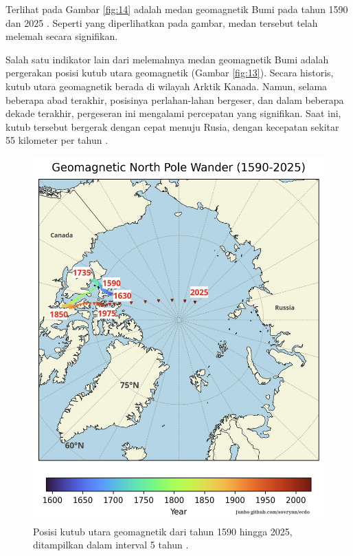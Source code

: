 \documentclass[10pt,twocolumn,letterpaper]{article}
\begin{document}
Terlihat pada Gambar \ref{fig:14} adalah medan geomagnetik Bumi pada tahun 1590 dan 2025 \cite{125,126}. Seperti yang diperlihatkan pada gambar, medan tersebut telah melemah secara signifikan.

Salah satu indikator lain dari melemahnya medan geomagnetik Bumi adalah pergerakan posisi kutub utara geomagnetik (Gambar \ref{fig:13}). Secara historis, kutub utara geomagnetik berada di wilayah Arktik Kanada. Namun, selama beberapa abad terakhir, posisinya perlahan-lahan bergeser, dan dalam beberapa dekade terakhir, pergeseran ini mengalami percepatan yang signifikan. Saat ini, kutub tersebut bergerak dengan cepat menuju Rusia, dengan kecepatan sekitar 55 kilometer per tahun \cite{124}.

\begin{figure}[t]
\begin{center}
   \includegraphics[width=1\linewidth]{npw.jpg}
\end{center}
   \caption{Posisi kutub utara geomagnetik dari tahun 1590 hingga 2025, ditampilkan dalam interval 5 tahun \cite{142}.}
\label{fig:13}
\label{fig:onecol}
\end{figure}
\end{document}
